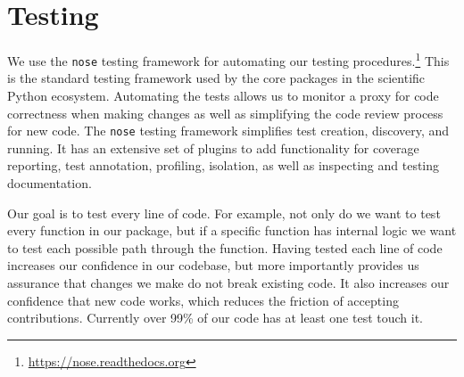 \section{\label{sec:test}Testing}

We use the \texttt{nose} testing framework for automating our testing
procedures.\footnote{\url{https://nose.readthedocs.org}}  This is the standard
testing framework used by the core packages in the scientific Python ecosystem.
Automating the tests allows us to monitor a proxy for code correctness when
making changes as well as simplifying the code review process for new code. 
The \texttt{nose} testing framework simplifies test creation, discovery,
and running. It has an extensive set of plugins to add functionality
for coverage reporting, test annotation, profiling, isolation, as well
as inspecting and testing documentation.

%

%
%



Our goal is to test every line of code.  For example, not only do we want to
test every function in our package, but if a specific function has internal
logic we want to test each possible path through the function.  Having tested
each line of code increases our confidence in our codebase, but more
importantly provides us assurance that changes we make do not break existing
code.  It also increases our confidence that new code works, which reduces the
friction of accepting contributions.  Currently over 99\% of our code has at
least one test touch it.

